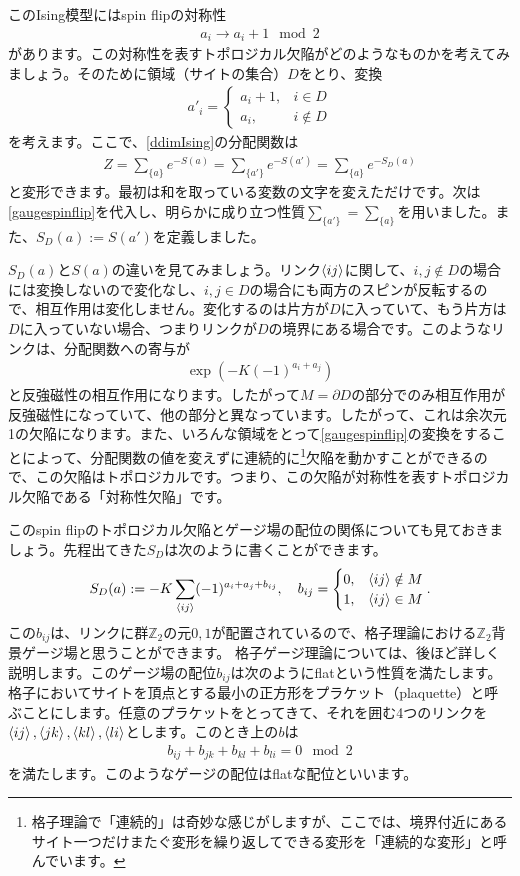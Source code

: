 \documentclass[report,paper=a4, fontsize=12pt, line_length=16cm, number_of_lines=33,dvipdfmx]{jlreq}
\numberwithin{equation}{chapter}
\newcommand{\del}{\partial}
\newcommand{\Zb}{\mathbb{Z}}
\newcommand{\link}[1]{\expval{#1}}
\begin{document}
このIsing模型にはspin flipの対称性
\begin{align}
  a_i \to a_i+1 \mod{2}
\end{align}
があります。この対称性を表すトポロジカル欠陥がどのようなものかを考えてみましょう。そのために領域（サイトの集合）$D$をとり、変換
\begin{align}
  a'_i=
  \begin{cases}
    a_i+1,& i\in D\\
    a_i,& i \notin D
  \end{cases}
  \label{gaugespinflip}
\end{align}
を考えます。ここで、\eqref{ddimIsing}の分配関数は
\begin{align}
  Z=\sum_{\{a\}}e^{-S(a)}=\sum_{\{a'\}}e^{-S(a')}=\sum_{\{a\}}e^{-S_{D}(a)}
\end{align}
と変形できます。最初は和を取っている変数の文字を変えただけです。次は\eqref{gaugespinflip}を代入し、明らかに成り立つ性質$\sum_{\{a'\}}=\sum_{\{a\}}$を用いました。また、$S_{D}(a):=S(a')$を定義しました。

$S_{D}(a)$と$S(a)$の違いを見てみましょう。リンク$\link{ij}$に関して、$i,j\notin D$の場合には変換しないので変化なし、$i,j\in D$の場合にも両方のスピンが反転するので、相互作用は変化しません。変化するのは片方が$D$に入っていて、もう片方は$D$に入っていない場合、つまりリンクが$D$の境界にある場合です。このようなリンクは、分配関数への寄与が
\begin{align}
  \exp\left(-K(-1)^{a_i+a_j}\right)
\end{align}
と反強磁性の相互作用になります。したがって$M=\del D$の部分でのみ相互作用が反強磁性になっていて、他の部分と異なっています。したがって、これは余次元1の欠陥になります。また、いろんな領域をとって\eqref{gaugespinflip}の変換をすることによって、分配関数の値を変えずに連続的に\footnote{格子理論で「連続的」は奇妙な感じがしますが、ここでは、境界付近にあるサイト一つだけまたぐ変形を繰り返してできる変形を「連続的な変形」と呼んでいます。}欠陥を動かすことができるので、この欠陥はトポロジカルです。つまり、この欠陥が対称性を表すトポロジカル欠陥である「対称性欠陥」です。

このspin flipのトポロジカル欠陥とゲージ場の配位の関係についても見ておきましょう。先程出てきた$S_{D}$は次のように書くことができます。
\begin{align}
  S_{D}(a):=-K\sum_{\link{ij}}(-1)^{a_i+a_j+b_{ij}},\quad
  b_{ij}=\begin{cases}
    0, & \link{ij}\notin M\\
    1, & \link{ij} \in M
  \end{cases}.
\end{align}
この$b_{ij}$は、リンクに群$\Zb_2$の元$0,1$が配置されているので、格子理論における$\Zb_2$背景ゲージ場と思うことができます。
格子ゲージ理論については、後ほど詳しく説明します。このゲージ場の配位$b_{ij}$は次のようにflatという性質を満たします。格子においてサイトを頂点とする最小の正方形をプラケット（plaquette）と呼ぶことにします。任意のプラケットをとってきて、それを囲む4つのリンクを$\link{ij},\link{jk},\link{kl},\link{li}$とします。このとき上の$b$は
\begin{align}
  b_{ij}+b_{jk}+b_{kl}+b_{li}=0 \mod{2}
\end{align}
を満たします。このようなゲージの配位はflatな配位といいます。
\end{document}
